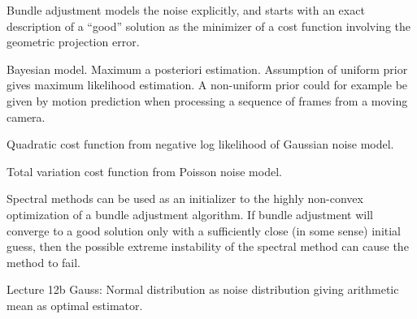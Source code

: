 \documentclass{article}
\begin{document}
Bundle adjustment models the noise explicitly, and starts with an exact description of a ``good'' solution as the
minimizer of a cost function involving the geometric projection error.

Bayesian model. Maximum a posteriori estimation. Assumption of uniform prior gives maximum likelihood estimation.
A non-uniform prior could for example be given by motion prediction when processing a sequence of frames from a moving camera.

Quadratic cost function from negative log likelihood of Gaussian noise model.

Total variation cost function from Poisson noise model.

Spectral methods can be used as an initializer to the highly non-convex optimization of a bundle adjustment algorithm.
If bundle adjustment will converge to a good solution only with a sufficiently close (in some sense) initial guess,
then the possible extreme instability of the spectral method can cause the method to fail.

Lecture 12b Gauss: Normal distribution as noise distribution giving arithmetic mean as optimal estimator.
\end{document}
